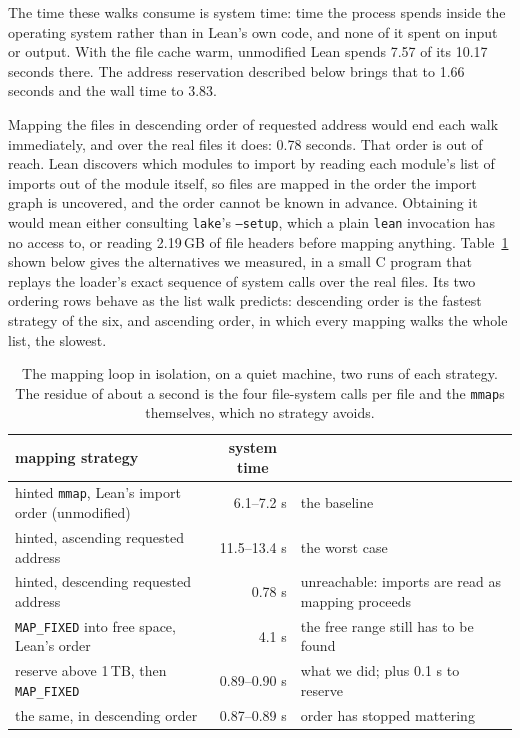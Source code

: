 \documentclass{article}
\newcommand{\Lean}{Lean\xspace}      %
\newcommand{\lake}{\texttt{lake}\xspace}      %
\begin{document}
The time these walks consume is system time: time the process spends inside the operating system rather than in \Lean's own code, and none of it spent on input or output. With the file cache warm, unmodified \Lean spends 7.57 of its 10.17 seconds there. The address reservation described below brings that to 1.66 seconds and the wall time to 3.83.

Mapping the files in descending order of requested address would end each walk immediately, and over the real files it does: 0.78 seconds. That order is out of reach. \Lean discovers which modules to import by reading each module's list of imports out of the module itself, so files are mapped in the order the import graph is uncovered, and the order cannot be known in advance. Obtaining it would mean either consulting \lake's \texttt{--setup}, which a plain \texttt{lean} invocation has no access to, or reading 2.19\,GB of file headers before mapping anything. Table~\ref{tab:tn-mmapstrategies} shown below gives the alternatives we measured, in a small C program that replays the loader's exact sequence of system calls over the real files. Its two ordering rows behave as the list walk predicts: descending order is the fastest strategy of the six, and ascending order, in which every mapping walks the whole list, the slowest.

\begin{table}[htbp]
\centering
\footnotesize
\setlength{\tabcolsep}{6pt}
\begin{tabular}{lrl}
\toprule
mapping strategy & \multicolumn{1}{c}{system time} & \\
\midrule
hinted \texttt{mmap}, \Lean's import order (unmodified) & 6.1--7.2 s & the baseline \\
hinted, ascending requested address & 11.5--13.4 s & the worst case \\
hinted, descending requested address & 0.78 s & unreachable: imports are read as mapping proceeds\\
\texttt{MAP\_FIXED} into free space, \Lean's order & 4.1 s & the free range still has to be found \\
reserve above 1\,TB, then \texttt{MAP\_FIXED} & 0.89--0.90 s & what we did; plus 0.1 s to reserve \\
the same, in descending order & 0.87--0.89 s & order has stopped mattering \\
\bottomrule
\end{tabular}
\caption{The mapping loop in isolation, on a quiet machine, two runs of each strategy. The residue of about a second is the four file-system calls per file and the \texttt{mmap}s themselves, which no strategy avoids.}
\label{tab:tn-mmapstrategies}
\end{table}
\end{document}
